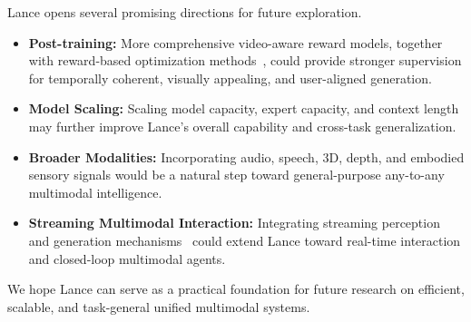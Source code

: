 \documentclass{llmxive}
\providecommand{\authorheading}[1]{}
\providecommand{\authornames}[1]{}
\begin{document}
Lance opens several promising directions for future exploration. 
\begin{itemize}
    \item \textbf{Post-training:} More comprehensive video-aware reward models, together with reward-based optimization methods~\cite{liu2026flow,xue2025dancegrpo,zheng2025diffusionnft}, could provide stronger supervision for temporally coherent, visually appealing, and user-aligned generation.

    \item \textbf{Model Scaling:} Scaling model capacity, expert capacity, and context length may further improve Lance's overall capability and cross-task generalization.

    \item \textbf{Broader Modalities:} Incorporating audio, speech, 3D, depth, and embodied sensory signals would be a natural step toward general-purpose any-to-any multimodal intelligence.

    \item \textbf{Streaming Multimodal Interaction:}  Integrating streaming perception and generation mechanisms~\cite{huang2026self,wu2026stream,tu2026stream} could extend Lance toward real-time interaction and closed-loop multimodal agents.
\end{itemize}

We hope Lance can serve as a practical foundation for future research on efficient, scalable, and task-general unified multimodal systems.
% 







\end{document}
